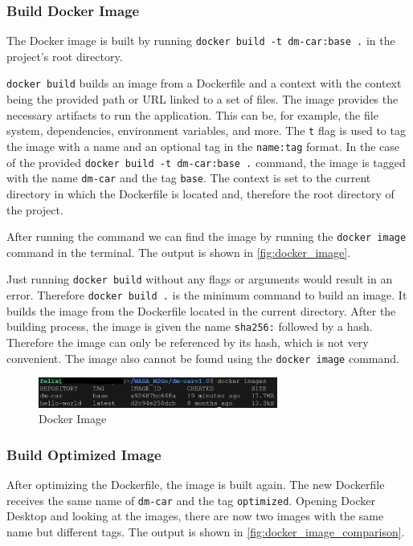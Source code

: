 \subsubsection*{Build Docker Image}
The Docker image is built by running \texttt{docker build -t dm-car:base .} in the project's root directory.

\texttt{docker build} builds an image from a Dockerfile and a context with the context being the provided path or URL linked to a set of files.
The image provides the necessary artifacts to run the application.
This can be, for example, the file system, dependencies, environment variables, and more.
The \texttt{\-t} flag is used to tag the image with a name and an optional tag in the \texttt{name:tag} format.
In the case of the provided \texttt{docker build -t dm-car:base .} command, the image is tagged with the name \texttt{dm-car} and the tag \texttt{base}.
The context is set to the current directory in which the Dockerfile is located and, therefore the root directory of the project.

After running the command we can find the image by running the \texttt{docker image} command in the terminal.
The output is shown in \autoref{fig:docker_image}.

Just running \texttt{docker build} without any flags or arguments would result in an error.
Therefore \texttt{docker build .} is the minimum command to build an image.
It builds the image from the Dockerfile located in the current directory.
After the building process, the image is given the name \texttt{sha256:} followed by a hash.
Therefore the image can only be referenced by its hash, which is not very convenient.
The image also cannot be found using the \texttt{docker image} command.

\begin{figure}
    \centering
    \includegraphics[width=0.7\textwidth]{figures/microservices/dmCar/ms_dmCar_dockerImages.png}
    \caption{Docker Image}
    \label{fig:docker_image}
\end{figure}

\subsubsection*{Build Optimized Image}
After optimizing the Dockerfile, the image is built again.
The new Dockerfile receives the same name of \texttt{dm-car} and the tag \texttt{optimized}.
Opening Docker Desktop and looking at the images, there are now two images with the same name but different tags.
The output is shown in \autoref{fig:docker_image_comparison}.

